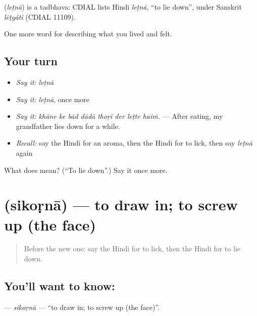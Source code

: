 \begin{cousinweb}
\textbf{} (\emph{leṭnā}) is a tadbhava: CDIAL lists Hindi \emph{leṭnā}, \textquotedblleft{}to lie down\textquotedblright{}, under Sanskrit \emph{lēṭyáti} (CDIAL 11109).
\end{cousinweb}

\begin{grammarlens}[title={What you've built}]
One more word for describing what you lived and felt.
\end{grammarlens}

\subsection*{Your turn}
\begin{itemize}
\raggedright
  \item \emph{Say it:} \emph{leṭnā}
  \item \emph{Say it:} \emph{leṭnā}, once more
  \item \emph{Say it:} \emph{khāne ke bād dādā thoṛī der leṭte haiṁ.} — After eating, my grandfather lies down for a while.
  \item \emph{Recall:} say the Hindi for an aroma, then the Hindi for to lick, then say \emph{leṭnā} again
\end{itemize}

\begin{tcolorbox}[breakable,colback=teal!4,colframe=teal!35!black,title={Before you move on}]
What does  mean? (\textquotedblleft{}To lie down\textquotedblright{}.) Say it once more.
\end{tcolorbox}
\section[\texorpdfstring{\hi{सिकोड़ना} (sikoṛnā)}{सिकोड़ना (sikoṛnā)}]{ (sikoṛnā) — to draw in; to screw up (the face)}

\label{lesson:HI-C481-sikorna}



\begin{quote}
Before the new one: say the Hindi for to lick, then the Hindi for to lie down.
\end{quote}

\subsection*{You'll want to know: }
\textbf{} — \emph{sikoṛnā} — \textquotedblleft{}to draw in; to screw up (the face)\textquotedblright{}.

